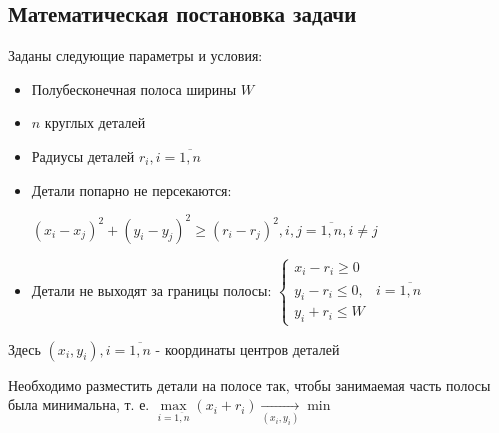 \subsection{Математическая постановка задачи}
Заданы следующие параметры и условия:
\begin{itemize}
\item Полубесконечная полоса ширины $W$ 
\item $n$ круглых деталей
\item Радиусы деталей  $r_{i}, i = \overline{1, n}$
\item Детали попарно не персекаются:

$(x_{i} - x_{j})^{2} + (y_{i} - y_{j})^{2} \ge (r_{i} - r_{j})^{2}, i, j = \overline{1, n}, i \neq j$
\item Детали не выходят за границы полосы: 
$%
\begin{cases}
	x_{i} - r_{i} \ge 0 \\
	y_{i} - r_{i} \le 0,	& i = \overline{1, n} \\
	y_{i} + r_{i} \le W
\end{cases}
$%
\end{itemize}

Здесь ${(x_{i}, y_{i}),   i = \overline{1, n}}$ - координаты центров деталей

Необходимо разместить детали на полосе так, чтобы занимаемая часть полосы была минимальна, т. е. ${\max\limits_{i = \overline{1, n}}(x_{i} + r_{i})\xrightarrow[{(x_i, y_i)}]{} \min}$
\printbibliography


